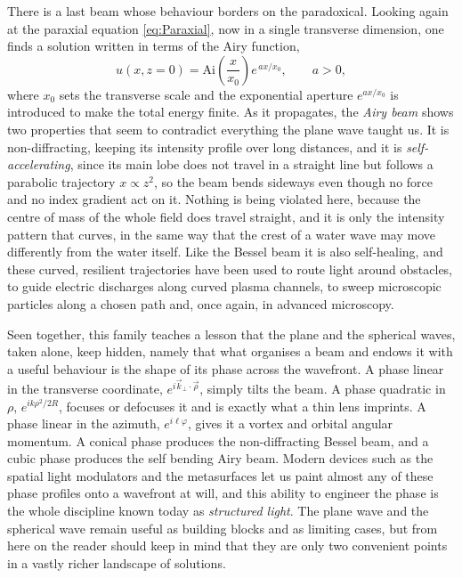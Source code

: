        There is a last beam whose behaviour borders on the paradoxical. Looking again at the paraxial equation \ref{eq:Paraxial}, now in a single transverse dimension, one finds a solution written in terms of the Airy function,
       \begin{equation}\label{eq:AiryBeam}
            u(x,z=0) = \text{Ai}\!\left(\frac{x}{x_0}\right)e^{\,a x/x_0}, \qquad a>0,
       \end{equation}
       where $x_0$ sets the transverse scale and the exponential aperture $e^{ax/x_0}$ is introduced to make the total energy finite. As it propagates, the \textit{Airy beam} shows two properties that seem to contradict everything the plane wave taught us. It is non-diffracting, keeping its intensity profile over long distances, and it is \textit{self-accelerating}, since its main lobe does not travel in a straight line but follows a parabolic trajectory $x\propto z^2$, so the beam bends sideways even though no force and no index gradient act on it. Nothing is being violated here, because the centre of mass of the whole field does travel straight, and it is only the intensity pattern that curves, in the same way that the crest of a water wave may move differently from the water itself. Like the Bessel beam it is also self-healing, and these curved, resilient trajectories have been used to route light around obstacles, to guide electric discharges along curved plasma channels, to sweep microscopic particles along a chosen path and, once again, in advanced microscopy.

       Seen together, this family teaches a lesson that the plane and the spherical waves, taken alone, keep hidden, namely that what organises a beam and endows it with a useful behaviour is the shape of its phase across the wavefront. A phase linear in the transverse coordinate, $e^{i\vec{k}_\perp\cdot\vec{\rho}}$, simply tilts the beam. A phase quadratic in $\rho$, $e^{ik\rho^2/2R}$, focuses or defocuses it and is exactly what a thin lens imprints. A phase linear in the azimuth, $e^{i\ell\varphi}$, gives it a vortex and orbital angular momentum. A conical phase produces the non-diffracting Bessel beam, and a cubic phase produces the self bending Airy beam. Modern devices such as the spatial light modulators and the metasurfaces let us paint almost any of these phase profiles onto a wavefront at will, and this ability to engineer the phase is the whole discipline known today as \textit{structured light}. The plane wave and the spherical wave remain useful as building blocks and as limiting cases, but from here on the reader should keep in mind that they are only two convenient points in a vastly richer landscape of solutions.

